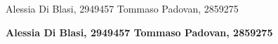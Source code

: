 \documentclass
[twoside,english,colorbacktitle,accentcolor=tud9c]
{tudexercise}
\newcommand{\studentdata}{}
\begin{document}
	
	\hwtitle{}
	\maketitle
	\lstset{language=Python} 
	\begin{examheader}
		\normalsize
		\vspace{-1em}
		Alessia Di Blasi, 2949457 \hfill \studentdata{}
		Tommaso Padovan, 2859275 \hfill \studentdata{}
		\vspace{-1em}
	\end{examheader} 
	
	\textbf{Alessia Di Blasi, 2949457 \hfill \studentdata{}
		Tommaso Padovan, 2859275 \hfill \studentdata{}}

	
	
	
	
	
\end{document}
